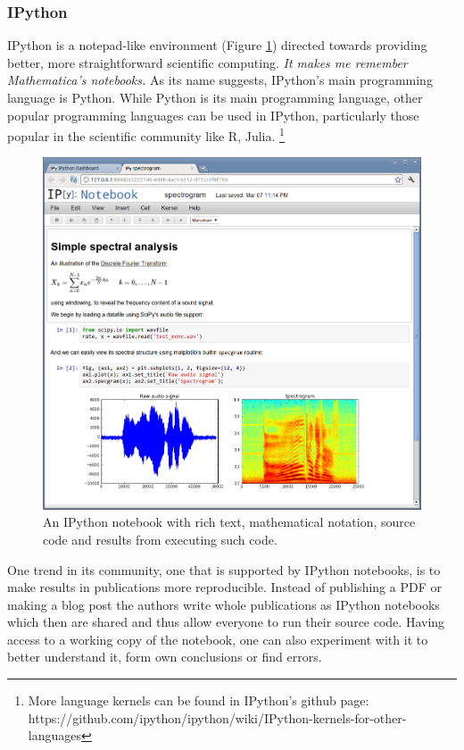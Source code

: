 \documentclass{./llncs2e/llncs}
\begin{document}
\subsubsection{IPython\cite{PER-GRA:2007}}
	IPython is a notepad-like environment (Figure \ref{fig:ipython:notebook}) directed towards providing better, more straightforward scientific computing. \emph{It makes me remember Mathematica's notebooks.} As its name suggests, IPython's main programming language is Python. 
	While Python is its main programming language, other popular programming languages can be used in IPython, particularly those popular in the scientific community like R, Julia. \footnote{More language kernels can be found in IPython's github page: https://github.com/ipython/ipython/wiki/IPython-kernels-for-other-languages}
	
	\begin{figure}
		\centering
		\includegraphics[width=1.0\textwidth]{img/ipython_notebook}
		\caption{An IPython notebook with rich text, mathematical notation, source code and results from executing such code.}
		\label{fig:ipython:notebook}
	\end{figure}
	
	One trend in its community, one that is supported by IPython notebooks, is to make results in publications more reproducible. 
	Instead of publishing a PDF or making a blog post the authors write whole publications as IPython notebooks which then are shared and thus allow everyone to run their source code. 
	Having access to a working copy of the notebook, one can also experiment with it to better understand it, form own conclusions or find errors.
	
\end{document}
